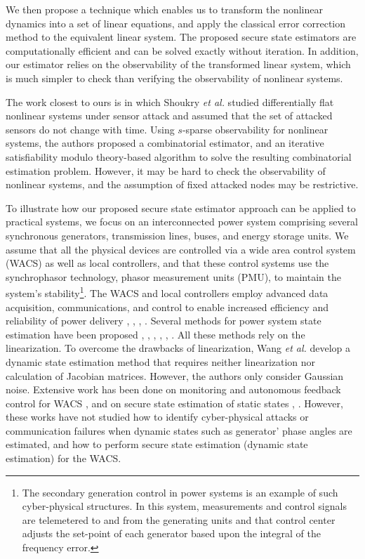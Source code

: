 We then propose a technique which enables us to transform the nonlinear dynamics into a set of linear equations, and apply the classical error correction method to the equivalent linear system. The proposed secure state estimators are computationally efficient and can be solved exactly without iteration. In addition, our estimator relies on the observability of the transformed linear system, which is much simpler to check than verifying the observability of nonlinear systems.


The work closest to ours is \cite{shoukry} in which Shoukry \textit{et al.} studied differentially flat nonlinear systems under sensor attack and assumed that the set of attacked sensors do not change with time. Using $s$-sparse observability for nonlinear systems, the authors proposed a combinatorial estimator, and an iterative satisfiability modulo theory-based algorithm to solve the resulting combinatorial estimation problem. However, it may be hard to check the observability of nonlinear systems, and the assumption of fixed attacked nodes may be restrictive.


To illustrate how our proposed secure state estimator approach can be applied to practical systems, we focus on an interconnected power system comprising several synchronous generators, transmission lines, buses, and energy storage units. We assume that all the physical devices are controlled via a wide area control system (WACS) as well as local controllers, and that these control systems use the synchrophasor technology, phasor measurement units (PMU), to maintain the system's stability\footnote{The secondary generation control in power systems is an example of such cyber-physical structures. In this system, measurements and control signals are telemetered to and from the generating units and that control center adjusts the set-point of each generator based upon the integral of the frequency error.}. The WACS and local controllers employ advanced data acquisition, communications, and control to enable increased efficiency and reliability of power delivery \cite{pmu_w_0}, \cite{pmu_w_1}, \cite{pmu_w_3}, \cite{wacs_ref8}. Several methods for power system state estimation have been proposed \cite{ref_v11}, \cite{ref_v12}, \cite{ref_v13}, \cite{ref_v14}, \cite{ref_v15}, \cite{ref_v16}. %
All these methods rely on the linearization. To overcome the drawbacks of linearization, Wang \textit{et al.} \cite{nonlin_est} develop a dynamic state estimation method that requires neither linearization nor calculation of Jacobian matrices. However, the authors only consider Gaussian noise. Extensive work has been done on monitoring and autonomous feedback control for WACS \cite{wacs_ref8}, and on secure state estimation of static states \cite{ref_v1}, \cite{Tong}. However, these works have not studied how to identify cyber-physical attacks or communication failures when dynamic states such as generator' phase angles are estimated, and how to perform secure state estimation (dynamic state estimation) for the WACS.


